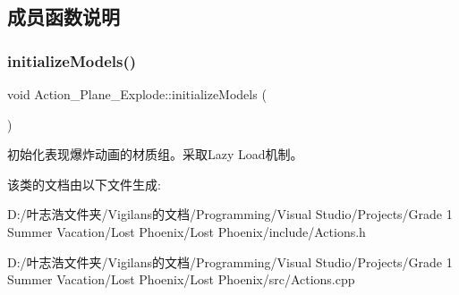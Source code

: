 \subsection{成员函数说明}
\mbox{\label{class_action___plane___explode_a797e8de15934ea7370086bde4cc45015}} 
\subsubsection{\texorpdfstring{initialize\+Models()}{initializeModels()}}
{\footnotesize\ttfamily void Action\+\_\+\+Plane\+\_\+\+Explode\+::initialize\+Models (\begin{DoxyParamCaption}{ }\end{DoxyParamCaption})\hspace{0.3cm}{\ttfamily [static]}}



初始化表现爆炸动画的材质组。采取\+Lazy Load机制。 



该类的文档由以下文件生成\+:\begin{DoxyCompactItemize}
\item 
D\+:/叶志浩文件夹/\+Vigilans的文档/\+Programming/\+Visual Studio/\+Projects/\+Grade 1 Summer Vacation/\+Lost Phoenix/\+Lost Phoenix/include/Actions.\+h\item 
D\+:/叶志浩文件夹/\+Vigilans的文档/\+Programming/\+Visual Studio/\+Projects/\+Grade 1 Summer Vacation/\+Lost Phoenix/\+Lost Phoenix/src/Actions.\+cpp\end{DoxyCompactItemize}
